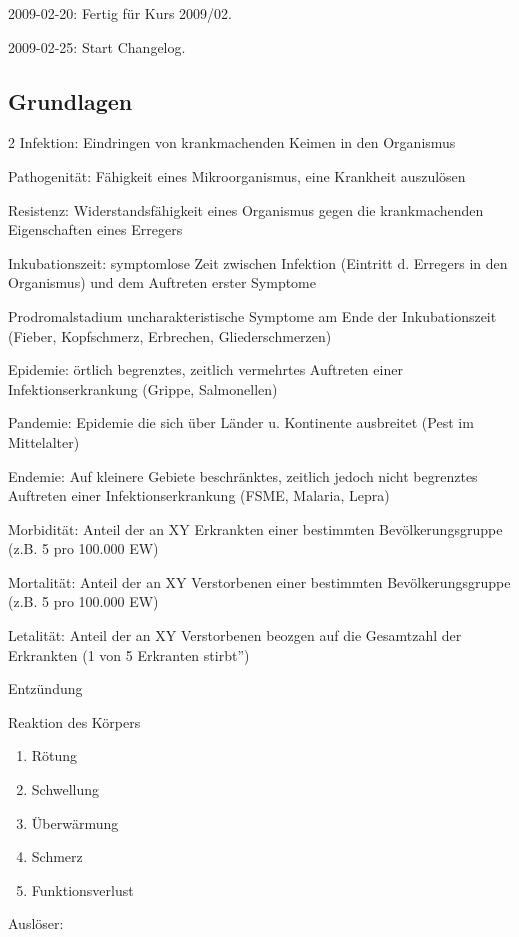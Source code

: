 \documentclass{article}
\begin{document}
2009-02-20: Fertig f\"ur Kurs 2009/02.

2009-02-25: Start Changelog.

\subsection{Grundlagen}
\begin{multicols}{2}
Infektion: Eindringen von krankmachenden Keimen in den
Organismus

Pathogenit\"at: F\"ahigkeit eines Mikroorganismus,
eine Krankheit auszul\"osen

Resistenz: Widerstandsf\"ahigkeit eines Organismus
gegen die  krankmachenden  Eigenschaften eines Erregers

Inkubationszeit: symptomlose Zeit zwischen
Infektion (Eintritt d. Erregers in den Organismus) und dem Auftreten
erster Symptome

Prodromalstadium  uncharakteristische Symptome
am Ende der Inkubationszeit (Fieber, Kopfschmerz, Erbrechen,
Gliederschmerzen)

Epidemie: \"ortlich begrenztes, zeitlich vermehrtes
Auftreten einer  Infektionserkrankung (Grippe, Salmonellen)

Pandemie: Epidemie die sich \"uber L\"ander u.
Kontinente ausbreitet (Pest im Mittelalter)

Endemie: Auf kleinere Gebiete beschr\"anktes, zeitlich
jedoch nicht begrenztes Auftreten einer Infektionserkrankung  (FSME,
Malaria, Lepra)

Morbidit\"at: Anteil der an XY Erkrankten einer
bestimmten Bev\"olkerungsgruppe (z.B. 5 pro 100.000 EW)

Mortalit\"at: Anteil der an XY Verstorbenen einer
bestimmten Bev\"olkerungsgruppe (z.B. 5 pro 100.000 EW)

Letalit\"at:  Anteil der an XY Verstorbenen beozgen
auf die Gesamtzahl der Erkrankten ({\quotedblbase}1 von 5 Erkranten
stirbt{\textquotedblright})

\end{multicols}
Entz\"undung

Reaktion des K\"orpers

\begin{enumerate}
\item R\"otung 

\item Schwellung 

\item \"Uberw\"armung 

\item Schmerz 

\item Funktionsverlust 

\end{enumerate}
Ausl\"oser:
\end{document}
